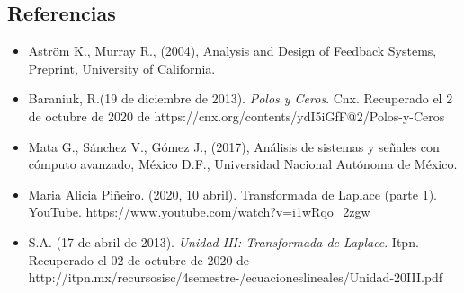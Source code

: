 \documentclass[10pt]{article}
\begin{document}
	
	\newcommand{\iu}{{i\mkern1mu}}
	\addtolength{\jot}{1em}

	
	
%	
%	
%	
%	
	
	
	
	
	
	\subsection*{Referencias}
	
	\begin{itemize}
		\item Aström K., Murray R., (2004), Analysis and Design of Feedback Systems, Preprint, University of California.
		\item Baraniuk, R.(19 de diciembre de 2013).\textit{ Polos y Ceros}. Cnx. Recuperado el 2 de octubre  de 2020 de
		\subitem https://cnx.org/contents/ydI5iGfF@2/Polos-y-Ceros	
		\item Mata G., Sánchez V., Gómez J., (2017), Análisis de sistemas y señales con cómputo avanzado, México D.F., Universidad Nacional Autónoma de México.
		\item Maria Alicia Piñeiro. (2020, 10 abril). Transformada de Laplace (parte 1). YouTube. 
		\subitem https://www.youtube.com/watch?v=i1wRqo\_2zgw
		
		\item	S.A. (17 de abril de 2013).\textit{ Unidad III: Transformada de Laplace}. Itpn. Recuperado el 02 de octubre de 2020 de http://itpn.mx/recursosisc/4semestre-/ecuacioneslineales/Unidad-20III.pdf
	\end{itemize}
	
	
\end{document}

